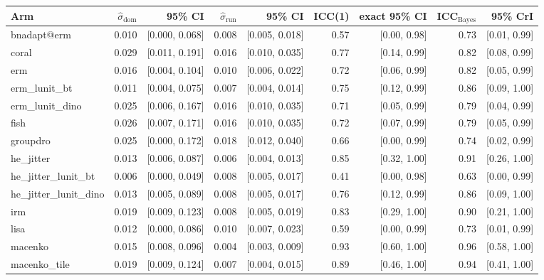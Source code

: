 \begin{tabular}{lrrrrrrrr}
\toprule
Arm & $\hat\sigma_\text{dom}$ & 95\% CI & $\hat\sigma_\text{run}$ & 95\% CI & ICC(1) & exact 95\% CI & ICC$_\text{Bayes}$ & 95\% CrI \\
\midrule
bnadapt@erm & 0.010 & [0.000, 0.068] & 0.008 & [0.005, 0.018] & 0.57 & [0.00, 0.98] & 0.73 & [0.01, 0.99] \\
coral & 0.029 & [0.011, 0.191] & 0.016 & [0.010, 0.035] & 0.77 & [0.14, 0.99] & 0.82 & [0.08, 0.99] \\
erm & 0.016 & [0.004, 0.104] & 0.010 & [0.006, 0.022] & 0.72 & [0.06, 0.99] & 0.82 & [0.05, 0.99] \\
erm\_lunit\_bt & 0.011 & [0.004, 0.075] & 0.007 & [0.004, 0.014] & 0.75 & [0.12, 0.99] & 0.86 & [0.09, 1.00] \\
erm\_lunit\_dino & 0.025 & [0.006, 0.167] & 0.016 & [0.010, 0.035] & 0.71 & [0.05, 0.99] & 0.79 & [0.04, 0.99] \\
fish & 0.026 & [0.007, 0.171] & 0.016 & [0.010, 0.035] & 0.72 & [0.07, 0.99] & 0.79 & [0.05, 0.99] \\
groupdro & 0.025 & [0.000, 0.172] & 0.018 & [0.012, 0.040] & 0.66 & [0.00, 0.99] & 0.74 & [0.02, 0.99] \\
he\_jitter & 0.013 & [0.006, 0.087] & 0.006 & [0.004, 0.013] & 0.85 & [0.32, 1.00] & 0.91 & [0.26, 1.00] \\
he\_jitter\_lunit\_bt & 0.006 & [0.000, 0.049] & 0.008 & [0.005, 0.017] & 0.41 & [0.00, 0.98] & 0.63 & [0.00, 0.99] \\
he\_jitter\_lunit\_dino & 0.013 & [0.005, 0.089] & 0.008 & [0.005, 0.017] & 0.76 & [0.12, 0.99] & 0.86 & [0.09, 1.00] \\
irm & 0.019 & [0.009, 0.123] & 0.008 & [0.005, 0.019] & 0.83 & [0.29, 1.00] & 0.90 & [0.21, 1.00] \\
lisa & 0.012 & [0.000, 0.086] & 0.010 & [0.007, 0.023] & 0.59 & [0.00, 0.99] & 0.73 & [0.01, 0.99] \\
macenko & 0.015 & [0.008, 0.096] & 0.004 & [0.003, 0.009] & 0.93 & [0.60, 1.00] & 0.96 & [0.58, 1.00] \\
macenko\_tile & 0.019 & [0.009, 0.124] & 0.007 & [0.004, 0.015] & 0.89 & [0.46, 1.00] & 0.94 & [0.41, 1.00] \\

\end{tabular}
